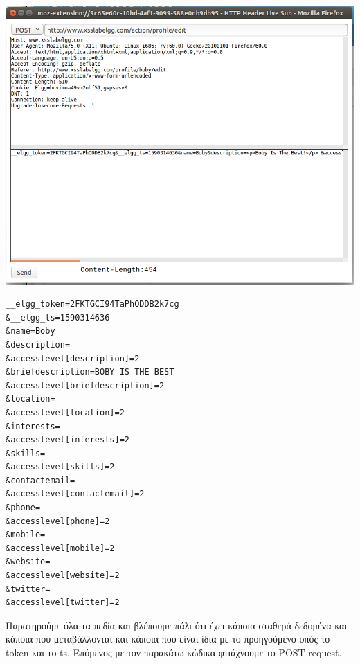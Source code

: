 \begin{center}
			\includegraphics[width=1\textwidth]{image/5.0.3.PNG}		
\end{center}

\begin{center}
	\begin{lstlisting}	
__elgg_token=2FKTGCI94TaPhODDB2k7cg
&__elgg_ts=1590314636
&name=Boby
&description=
&accesslevel[description]=2
&briefdescription=BOBY IS THE BEST
&accesslevel[briefdescription]=2
&location=
&accesslevel[location]=2
&interests=
&accesslevel[interests]=2
&skills=
&accesslevel[skills]=2
&contactemail=
&accesslevel[contactemail]=2
&phone=
&accesslevel[phone]=2
&mobile=
&accesslevel[mobile]=2
&website=
&accesslevel[website]=2
&twitter=
&accesslevel[twitter]=2
	\end{lstlisting}	
\end{center}
\noindent
Παρατηρούμε όλα τα πεδία και βλέπουμε πάλι ότι έχει κάποια σταθερά δεδομένα
και κάποια που μεταβάλλονται και κάποια που είναι ίδια με το προηγούμενο
οπός το token και το ts. 
Επόμενος με τον παρακάτω κώδικα φτιάχνουμε το POST request.


